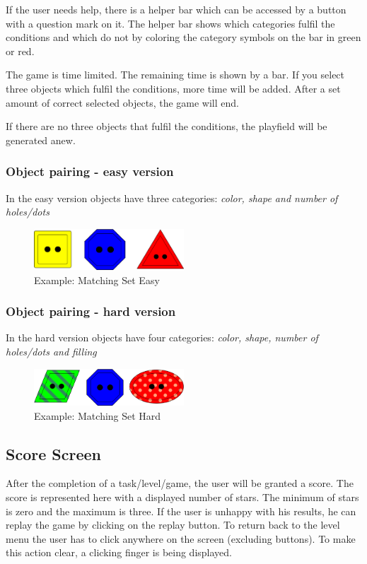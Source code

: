 If the user needs help, there is a helper bar which can be accessed by a button with a question mark on it.
The helper bar shows which categories fulfil the conditions and which do not
by coloring the category symbols on the bar in green or red.

The game is time limited. The remaining time is shown by a bar.
If you select three objects which fulfil the conditions, more time will be added.
After a set amount of correct selected objects, the game will end.

If there are no three objects that fulfil the conditions, the playfield will be generated anew.

\subsubsection{Object pairing - easy version}\label{subsubsec:object-pairing---easy-version}
In the easy version objects have three categories: \textit{color, shape and number of holes/dots}

\begin{figure}[H]
    \centering
    \includegraphics[width=0.5\textwidth]{figures/matchingseteasy}
    \caption{Example: Matching Set Easy}
    \label{fig:matchingseteasy}
\end{figure}

\subsubsection{Object pairing - hard version}\label{subsubsec:object-pairing---hard-version}
In the hard version objects have four categories: \textit{color, shape, number of holes/dots and filling}

\begin{figure}[H]
    \centering
    \includegraphics[width=0.5\textwidth]{figures/matchingsethard}
    \caption{Example: Matching Set Hard}
    \label{fig:matchingsethard}
\end{figure}

\subsection{Score Screen}\label{subsec:score-screen}
After the completion of a task/level/game, the user will be granted a score.
The score is represented here with a displayed number of stars.
The minimum of stars is zero and the maximum is three.
If the user is unhappy with his results, he can replay the game by clicking on the replay button.
To return back to the level menu the user has to click anywhere on the screen (excluding buttons).
To make this action clear, a clicking finger is being displayed.

